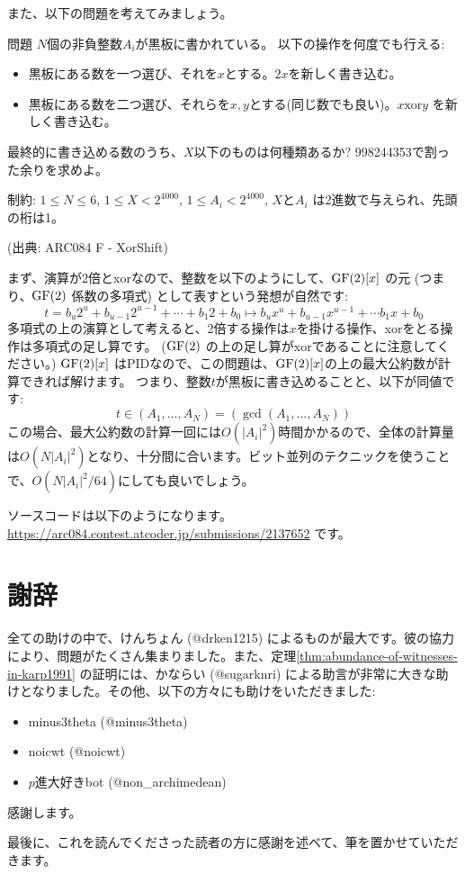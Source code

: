 \documentclass{jsarticle}
\begin{document}
 また、以下の問題を考えてみましょう。
 \begin{itembox}[l]{問題}
  $N$個の非負整数$A_i$が黒板に書かれている。
  以下の操作を何度でも行える:
  \begin{itemize}
   \item 黒板にある数を一つ選び、それを$x$とする。$2x$を新しく書き込む。
   \item 黒板にある数を二つ選び、それらを$x,y$とする(同じ数でも良い)。$x \mathbin{\mathrm{xor}} y$ を新しく書き込む。
  \end{itemize}
  最終的に書き込める数のうち、$X$以下のものは何種類あるか? 998244353で割った余りを求めよ。

  制約: $1 \le N \le 6$, $1 \le X < 2^{4000}$, $1 \le A_i < 2^{4000}$, $X$と$A_i$ は2進数で与えられ、先頭の桁は1。

  (出典: ARC084 F - XorShift)
 \end{itembox}
 まず、演算が2倍とxorなので、整数を以下のようにして、$\mathrm{GF}(2)[x]$ の元
 (つまり、$\mathrm{GF}(2)$ 係数の多項式) として表すという発想が自然です:
 \begin{displaymath}
  t = b_u 2^u + b_{u-1}2^{u-1} + \cdots + b_1 2 + b_0 \mapsto
  b_u x^u + b_{u-1} x^{u-1} + \cdots b_1 x + b_0
 \end{displaymath}
 多項式の上の演算として考えると、2倍する操作は$x$を掛ける操作、xorをとる操作は多項式の足し算です。 ($\mathrm{GF}(2)$ の上の足し算がxorであることに注意してください。)
 $\mathrm{GF}(2)[x]$ はPIDなので、この問題は、$\mathrm{GF}(2)[x]$の上の最大公約数が計算できれば解けます。
 つまり、整数$t$が黒板に書き込めることと、以下が同値です:
 \begin{displaymath}
  t \in (A_1, \ldots, A_N) = (\gcd(A_1, \ldots, A_N))
 \end{displaymath}
 この場合、最大公約数の計算一回には$O(|A_i|^2)$時間かかるので、全体の計算量は$O(N|A_i|^2)$となり、十分間に合います。ビット並列のテクニックを使うことで、$O(N|A_i|^2/64)$にしても良いでしょう。

 ソースコードは以下のようになります。\url{https://arc084.contest.atcoder.jp/submissions/2137652} です。
 
\printindex
 \section*{謝辞}
 \label{sec:acknowledgements}
 全ての助けの中で、けんちょん (@drken1215) によるものが最大です。彼の協力により、問題がたくさん集まりました。また、定理\ref{thm:abundance-of-witnesses-in-karp1991} の証明には、かならい (@sugarknri) による助言が非常に大きな助けとなりました。その他、以下の方々にも助けをいただきました:
 \begin{itemize}
  \item minus3theta (@minus3theta)
  \item noicwt (@noicwt)
  \item $p$進大好きbot (@non\_archimedean)
 \end{itemize}
 感謝します。

 最後に、これを読んでくださった読者の方に感謝を述べて、筆を置かせていただきます。



\end{document}
